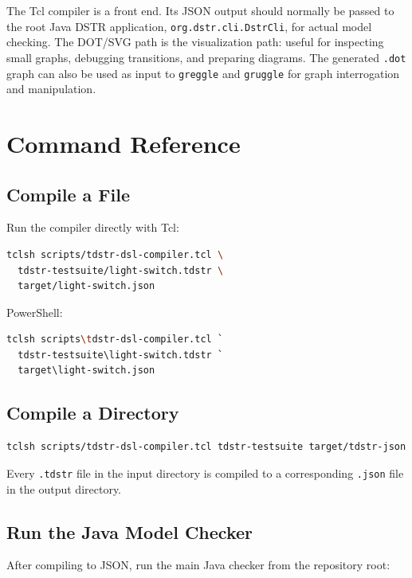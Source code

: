 \documentclass[11pt]{article}
\begin{document}
The Tcl compiler is a front end.  Its JSON output should normally be passed to
the root Java DSTR application, \texttt{org.dstr.cli.DstrCli}, for actual model
checking.  The DOT/SVG path is the visualization path: useful for inspecting
small graphs, debugging transitions, and preparing diagrams.  The generated
\texttt{.dot} graph can also be used as input to \texttt{greggle} and
\texttt{gruggle} for graph interrogation and manipulation.

\section{Command Reference}

\subsection{Compile a File}

Run the compiler directly with Tcl:

\begin{lstlisting}[language=bash]
tclsh scripts/tdstr-dsl-compiler.tcl \
  tdstr-testsuite/light-switch.tdstr \
  target/light-switch.json
\end{lstlisting}

PowerShell:

\begin{lstlisting}[language=bash]
tclsh scripts\tdstr-dsl-compiler.tcl `
  tdstr-testsuite\light-switch.tdstr `
  target\light-switch.json
\end{lstlisting}

\subsection{Compile a Directory}

\begin{lstlisting}[language=bash]
tclsh scripts/tdstr-dsl-compiler.tcl tdstr-testsuite target/tdstr-json
\end{lstlisting}

Every \texttt{.tdstr} file in the input directory is compiled to a corresponding
\texttt{.json} file in the output directory.

\subsection{Run the Java Model Checker}

After compiling to JSON, run the main Java checker from the repository root:
\end{document}
